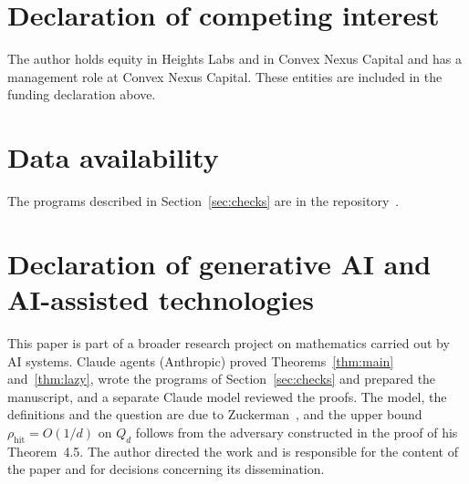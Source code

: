 \documentclass[11pt]{amsart}
\theoremstyle{remark}
\newcommand{\rhit}{\rho_{\mathrm{hit}}}
\begin{document}
\section*{Declaration of competing interest}
The author holds equity in Heights Labs and in Convex Nexus Capital and has a management role at Convex Nexus Capital.
These entities are included in the funding declaration above.

\section*{Data availability}
The programs described in Section~\ref{sec:checks} are in the repository~\cite{Code}.

\section*{Declaration of generative AI and AI-assisted technologies}
This paper is part of a broader research project on mathematics carried out by AI systems. Claude agents (Anthropic) proved
Theorems~\ref{thm:main} and~\ref{thm:lazy}, wrote the programs of Section~\ref{sec:checks} and prepared the manuscript,
and a separate Claude model reviewed the proofs. The model, the definitions and the question are due to
Zuckerman~\cite{Zuc26}, and the upper bound $\rhit=O(1/d)$ on $Q_d$ follows from the adversary constructed in the proof of his Theorem~4.5. The author directed
the work and is responsible for the content of the paper and for decisions concerning its dissemination.
\end{document}
